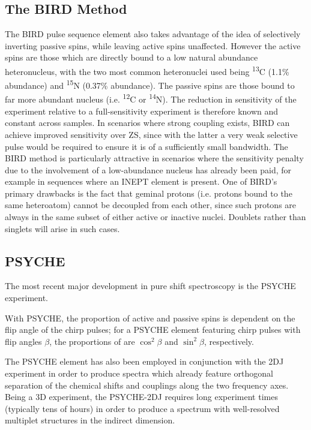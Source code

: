 \subsection{The \acs{BIRD} Method}
The \ac{BIRD} pulse sequence element\cite{Garbow1982,Bax1983} also takes
advantage of the idea of selectively inverting passive spins, while leaving
active spins unaffected.
However the active spins are those which are directly bound to a low natural
abundance
heteronucleus, with the two most common heteronuclei used being
\textsuperscript{13}C (1.1\% abundance) and \textsuperscript{15}N (0.37\%
abundance).
The passive spins are those bound to far more abundant nucleus (i.e.
\textsuperscript{12}C or \textsuperscript{14}N). The reduction in sensitivity
of the experiment relative to a full-sensitivity experiment is therefore known
and constant across samples. In scenarios where strong coupling exists, \ac{BIRD} can
achieve improved sensitivity over \ac{ZS}, since with the latter a very weak
selective pulse would be required to ensure it is of a sufficiently small
bandwidth. The \ac{BIRD} method is particularly attractive in scenarios where
the sensitivity penalty due to the involvement of a low-abundance nucleus has
already been paid, for example in sequences where an \ac{INEPT} element is
present\cite{Paudel2013}. One of \ac{BIRD}'s primary drawbacks is the fact that
geminal protons (i.e. protons bound to the same heteroatom) cannot be decoupled
from each other, since such protons are always in the same subset of either
active or inactive nuclei. Doublets rather than singlets will arise in such
cases.

\subsection{\acs{PSYCHE}}
\label{subsec:psyche}
The most recent major development in pure shift spectroscopy is the \ac{PSYCHE}
experiment\cite{Foroozandeh2014,Foroozandeh2018}.

With \ac{PSYCHE}, the proportion of active and passive spins is
dependent on the flip angle of the chirp pulses; for a
\ac{PSYCHE} element featuring chirp pulses with flip angles $\beta$, the
proportions of are $\cos^2 \beta$ and $\sin^2 \beta$, respectively.

The \ac{PSYCHE} element has also been employed in conjunction with the \ac{2DJ}
experiment in order to produce spectra which already feature orthogonal
separation of the chemical shifts and couplings along the two frequency
axes\cite{Foroozandeh2015,Kiraly2017}. Being a 3D experiment, the
\ac{PSYCHE}-\ac{2DJ} requires long experiment times (typically tens of hours)
in order to produce a spectrum with well-resolved multiplet structures in the
indirect dimension.

